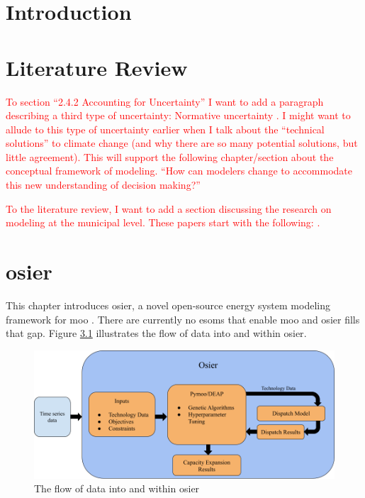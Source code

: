 \chapter{Introduction}
\chapter{Literature Review}
\label{chapter:lit-review}

\textcolor{red}{To section ``2.4.2 Accounting for Uncertainty'' I want to add 
a paragraph describing a third type of uncertainty: Normative uncertainty 
\cite{taebi_governing_2020}. I might want to allude to this type of uncertainty
earlier when I talk about the ``technical solutions'' to climate change (and why
there are so many potential solutions, but little agreement). This will support
the following chapter/section about the conceptual framework of modeling. ``How
can modelers change to accommodate this new understanding of decision making?''}

\textcolor{red}{To the literature review, I want to add a section discussing 
the research on modeling at the municipal level. These papers start with the 
following: 
\cite{mckenna_combining_2018,johannsen_municipal_2023,ben_amer_too_2020}.}




\chapter{\acf{osier}}
\label{chapter:osier}

This chapter introduces \acf{osier}, a novel open-source energy system modeling
framework for \acl{moo} \cite{dotson_osier_nodate}. There are currently no
\acp{esom} that enable \ac{moo} and \ac{osier} fills that gap. Figure 
\ref{fig:osier_flow} illustrates the flow of data into and within \ac{osier}.

\begin{figure}[H]
    \centering
    \includegraphics[width=\columnwidth]{figures/osier_flow}
    \caption{The flow of data into and within \ac{osier}}
    \label{fig:osier_flow}
\end{figure}

